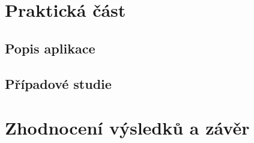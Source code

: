 \documentclass[a4paper, 12pt]{report}
\begin{document}


\chapter{Praktická část}
\renewcommand{\chaptername}{Praktická část}

\section{Popis aplikace}



\section{Případové studie}

\renewcommand{\chaptername}{Zhodnocení výsledků a závěr}
\chapter{Zhodnocení výsledků a závěr}



\end{document}
